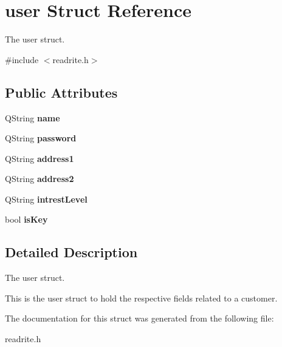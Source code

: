\hypertarget{structuser}{}\section{user Struct Reference}
\label{structuser}


The user struct.  




{\ttfamily \#include $<$readrite.\+h$>$}

\subsection*{Public Attributes}
\begin{DoxyCompactItemize}
\item 
\hypertarget{structuser_ad044cc7054ee3116809f97698017eb49}{}\label{structuser_ad044cc7054ee3116809f97698017eb49} 
Q\+String {\bfseries name}
\item 
\hypertarget{structuser_a2b1a33adf680f13f15e5071f73e0279f}{}\label{structuser_a2b1a33adf680f13f15e5071f73e0279f} 
Q\+String {\bfseries password}
\item 
\hypertarget{structuser_a2e40bf8fed819f9b7d98a38f2227f524}{}\label{structuser_a2e40bf8fed819f9b7d98a38f2227f524} 
Q\+String {\bfseries address1}
\item 
\hypertarget{structuser_a2d0ec864894b448db9360fba7052672a}{}\label{structuser_a2d0ec864894b448db9360fba7052672a} 
Q\+String {\bfseries address2}
\item 
\hypertarget{structuser_a12e18612bc94f5c63b27c5e432946765}{}\label{structuser_a12e18612bc94f5c63b27c5e432946765} 
Q\+String {\bfseries intrest\+Level}
\item 
\hypertarget{structuser_a1230fdce012d16fd66ebde09e760b87d}{}\label{structuser_a1230fdce012d16fd66ebde09e760b87d} 
bool {\bfseries is\+Key}
\end{DoxyCompactItemize}


\subsection{Detailed Description}
The user struct. 

This is the user struct to hold the respective fields related to a customer. 

The documentation for this struct was generated from the following file\+:\begin{DoxyCompactItemize}
\item 
readrite.\+h\end{DoxyCompactItemize}
